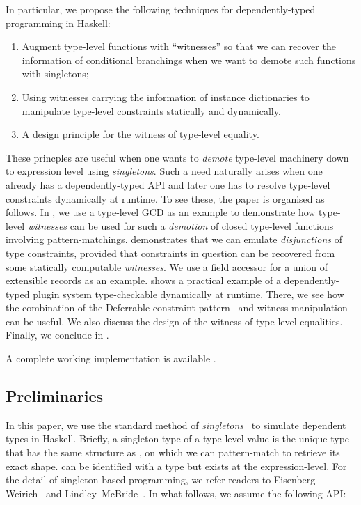 \documentclass[demotion-paper.tex]{subfiles}
\begin{document}
In particular, we propose the following techniques for dependently-typed programming in Haskell:
\begin{enumerate}
\item Augment type-level functions with ``witnesses'' so that we can recover the information of conditional branchings when we want to demote such functions with singletons;
\item Using witnesses carrying the information of instance dictionaries to manipulate type-level constraints statically and dynamically.
\item A design principle for the witness of type-level equality.
\end{enumerate}
These princples are useful when one wants to \emph{demote} type-level machinery down to expression level using \emph{singletons}.
Such a need naturally arises when one already has a dependently-typed API and later one has to resolve type-level constraints dynamically at runtime.
To see these, the paper is organised as follows.
In , we use a type-level GCD as an example to demonstrate how type-level \emph{witnesses} can be used for such a \emph{demotion} of closed type-level functions involving pattern-matchings.
 demonstrates that we can emulate \emph{disjunctions} of type constraints, provided that constraints in question can be recovered from some statically computable \emph{witnesses}.
We use a field accessor for a union of extensible records as an example.
 shows a practical example of a dependently-typed plugin system type-checkable dynamically at runtime.
There, we see how the combination of the Deferrable constraint pattern~\cite{Kmett:2020ab} and witness manipulation can be useful.
We also discuss the design of the witness of type-level equalities.
Finally, we conclude in .

A complete working implementation is available .

\subsection{Preliminaries}
In this paper, we use the standard method of \emph{singletons}~\cite{Eisenberg:2012} to simulate dependent types in Haskell.
Briefly, a singleton type  of a type-level value  is the unique type that has the same structure as , on which we can pattern-match to retrieve its exact shape.
 can be identified with a type  but exists at the expression-level.
For the detail of singleton-based programming, we refer readers to Eisenberg--Weirich~\cite{Eisenberg:2012} and Lindley--McBride~\cite{10.1145/2503778.2503786}.
In what follows, we assume the following API:
\end{document}
